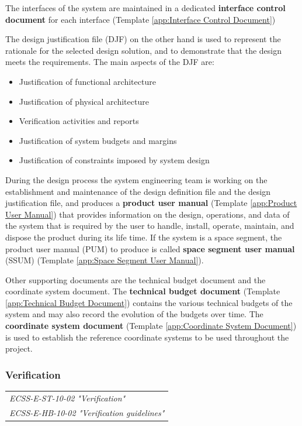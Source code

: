 The interfaces of the system are maintained in a dedicated \textbf{interface control document} for each interface (Template \ref{app:Interface Control Document}) 

The design justification file (DJF) on the other hand is used to represent the rationale for the selected design solution, and to demonstrate that the design meets the requirements. The main aspects of the DJF are:

\begin{itemize}
\item Justification of functional architecture
\item Justification of physical architecture
\item Verification activities and reports
\item Justification of system budgets and margins
\item Justification of constraints imposed by system design
\end{itemize}

During the design process the system engineering team is working on the establishment and maintenance of the design definition file and the design justification file, and produces a \textbf{product user manual} (Template \ref{app:Product User Manual}) that provides information on the design, operations, and data of the system that is required by the user to handle, install, operate, maintain, and dispose the product during its life time. If the system is a space segment, the product user manual (PUM) to produce is called \textbf{space segment user manual} (SSUM) (Template \ref{app:Space Segment User Manual}).

Other supporting documents are the technical budget document and the coordinate system document. The \textbf{technical budget document} (Template \ref{app:Technical Budget Document}) contains the various technical budgets of the system and may also record the evolution of the budgets over time. The \textbf{coordinate system document} (Template \ref{app:Coordinate System Document}) is used to establish the reference coordinate systems to be used throughout the project.

\subsubsection{Verification}
\label{sec:Verification}

\begin{tabular}{l}
\textit{ECSS-E-ST-10-02 "Verification" \cite{ECSS-E-ST-10-02}} \\
\textit{ECSS-E-HB-10-02 "Verification guidelines" \cite{ECSS-E-HB-10-02}}
\end{tabular}

